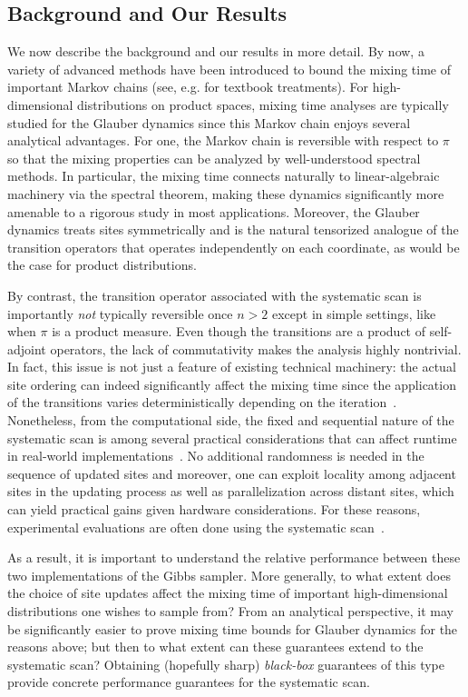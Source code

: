 \documentclass[11pt]{article}
\begin{document}
\subsection{Background and Our Results}
We now describe the background and our results in more detail. By now, a variety of advanced methods have been introduced to bound the mixing time of important Markov chains (see, e.g. \cite{levin2017markov,tetali} for textbook treatments). For high-dimensional distributions on product spaces, mixing time analyses are typically studied for the Glauber dynamics since this Markov chain enjoys several analytical advantages. For one, the Markov chain is reversible with respect to $\pi$ so that the mixing properties can be analyzed by well-understood spectral methods. In particular, the mixing time connects naturally to linear-algebraic machinery via the spectral theorem, making these dynamics significantly more amenable to a rigorous study in most applications. Moreover, the Glauber dynamics treats sites symmetrically and is the natural tensorized analogue of the transition operators that operates independently on each coordinate, as would be the case for product distributions. 

By contrast, the transition operator associated with the systematic scan is importantly \emph{not} typically reversible once $n>2$ except in simple settings, like when $\pi$ is a product measure. Even though the transitions are a product of self-adjoint operators, the lack of commutativity makes the analysis highly nontrivial. In fact, this issue is not just a feature of existing technical machinery: the actual site ordering can indeed significantly affect the mixing time since the application of the transitions varies deterministically depending on the iteration~\cite{roberts2015surprising,DBLP:conf/nips/HeSMR16}. Nonetheless, from the computational side, the fixed and sequential nature of the systematic scan is among several practical considerations that can affect runtime in real-world implementations~\cite{DBLP:conf/sigmod/ZhangR13}. No additional randomness is needed in the sequence of updated sites and moreover, one can exploit locality among adjacent sites in the updating process as well as parallelization across distant sites, which can yield practical gains given hardware considerations. For these reasons, experimental evaluations are often done using the systematic scan~\cite{DBLP:conf/approx/DyerGJ06}.

As a result, it is important to understand the relative performance between these two implementations of the Gibbs sampler. More generally, to what extent does the choice of site updates affect the mixing time of important high-dimensional distributions one wishes to sample from? From an analytical perspective, it may be significantly easier to prove mixing time bounds for Glauber dynamics for the reasons above; but then to what extent can these guarantees extend to the systematic scan? Obtaining (hopefully sharp) \emph{black-box} guarantees of this type provide concrete performance guarantees for the systematic scan.
\end{document}
